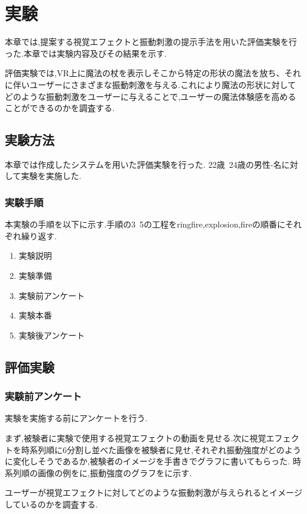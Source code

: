 \chapter{実験}
本章では,提案する視覚エフェクトと振動刺激の提示手法を用いた評価実験を行った.本章では実験内容及びその結果を示す.

評価実験では,VR上に魔法の杖を表示しそこから特定の形状の魔法を放ち、それに伴いユーザーにさまざまな振動刺激を与える.これにより魔法の形状に対してどのような振動刺激をユーザーに与えることで,ユーザーの魔法体験感を高めることができるのかを調査する.

\section{実験方法}
本章では作成したシステムを用いた評価実験を行った.
22歳~24歳の男性-名に対して実験を実施した.

\subsection{実験手順}
本実験の手順を以下に示す.手順の3~5の工程をringfire,explosion,fireの順番にそれぞれ繰り返す.

\begin{enumerate}
    \item 実験説明
    \item 実験準備
    \item 実験前アンケート
    \item 実験本番
    \item 実験後アンケート
\end{enumerate}

\section{評価実験}
\subsection{実験前アンケート}
実験を実施する前にアンケートを行う.

まず,被験者に実験で使用する視覚エフェクトの動画を見せる.次に視覚エフェクトを時系列順に6分割し並べた画像を被験者に見せ,それぞれ振動強度がどのように変化しそうであるか,被験者のイメージを手書きでグラフに書いてもらった.
時系列順の画像の例をに,振動強度のグラフをに示す.

ユーザーが視覚エフェクトに対してどのような振動刺激が与えられるとイメージしているのかを調査する.

